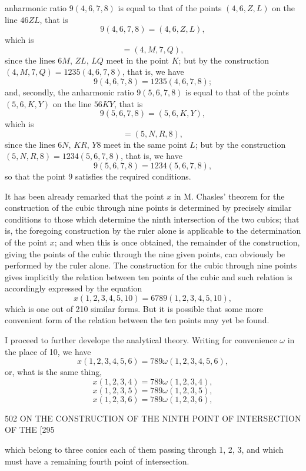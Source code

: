 \documentclass[11pt]{article}
\begin{document}
anharmonic ratio $9(4,6,7,8)$ is equal to that of the points $(4,6,Z,L)$ on the line
$46ZL$, that is
\[ 9(4,6,7,8) = (4,6,Z,L), \]
which is
\[ = (4,M,7,Q), \]
since the lines $6M$, $ZL$, $LQ$ meet in the point $K$; but by the construction
$(4,M,7,Q)=1235(4,6,7,8)$, that is, we have
\[ 9(4,6,7,8) = 1235(4,6,7,8); \]
and, secondly, the anharmonic ratio $9(5,6,7,8)$ is equal to that of the points
$(5,6,K,Y)$ on the line $56KY$, that is
\[ 9(5,6,7,8) = (5,6,K,Y), \]
which is
\[ = (5,N,R,8), \]
since the lines $6N$, $KR$, $Y8$ meet in the same point $L$; but by the construction
$(5,N,R,8)=1234(5,6,7,8)$, that is, we have
\[ 9(5,6,7,8) = 1234(5,6,7,8), \]
so that the point 9 satisfies the required conditions.

It has been already remarked that the point $x$ in M. Chasles' theorem for the
construction of the cubic through nine points is determined by precisely similar
conditions to those which determine the ninth intersection of the two cubics; that is,
the foregoing construction by the ruler alone is applicable to the determination of the
point $x$; and when this is once obtained, the remainder of the construction, giving
the points of the cubic through the nine given points, can obviously be performed
by the ruler alone. The construction for the cubic through nine points gives implicitly
the relation between ten points of the cubic and such relation is accordingly expressed
by the equation
\[ x(1,2,3,4,5,10) = 6789(1,2,3,4,5,10), \]
which is one out of 210 similar forms. But it is possible that some more convenient
form of the relation between the ten points may yet be found.

I proceed to further develope the analytical theory. Writing for convenience $\omega$
in the place of 10, we have
\[ x(1,2,3,4,5,6) = 789\omega(1,2,3,4,5,6), \]
or, what is the same thing,
\[ x(1,2,3,4) = 789\omega(1,2,3,4), \]
\[ x(1,2,3,5) = 789\omega(1,2,3,5), \]
\[ x(1,2,3,6) = 789\omega(1,2,3,6), \]

\newpage
\begin{center}
502 \hfill ON THE CONSTRUCTION OF THE NINTH POINT OF INTERSECTION OF THE \hfill \textsc{[295}
\end{center}

which belong to three conics each of them passing through 1, 2, 3, and which must
have a remaining fourth point of intersection.
\end{document}
